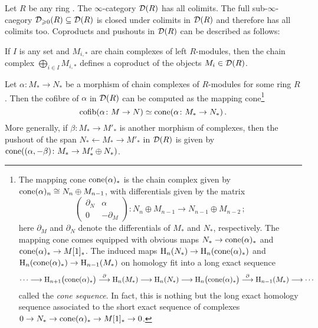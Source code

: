 \begin{lem}\label{lem:ColimitsInDR}
	Let $R$ be any ring . The $\infty$-category $\mathcal{D}(R)$ has all colimits. The full sub-$\infty$-caegory $\mathcal{D}_{\geqslant 0}(R)\subseteq \mathcal{D}(R)$ is closed under colimits in $\mathcal{D}(R)$ and therefore has all colimits too. Coproducts and pushouts in $\mathcal{D}(R)$ can be described as follows:
	\begin{alphanumerate}
		\item If $I$ is any set and $M_{i,*}$ are chain complexes of left $R$-modules, then the chain complex $\bigoplus_{i\in I}M_{i,*}$ defines a coproduct of the objects $M_i\in \mathcal{D}(R)$.\label{enum:CoproductsInDR}
		\item Let $\alpha\colon M_*\rightarrow N_*$ be a morphism of chain complexes of $R$-modules for some ring $R$. Then the cofibre of $\alpha$ in $\mathcal{D}(R)$ can be computed as the mapping cone\footnote{The mapping cone $\operatorname{cone}(\alpha)_*$ is the chain complex given by $\operatorname{cone}(\alpha)_n\cong N_n\oplus M_{n-1}$, with differentials given by the matrix
		\begin{equation*}
			\begin{pmatrix}
				\partial_N & \alpha\\
				0 & -\partial_M
			\end{pmatrix}\colon N_n\oplus M_{n-1}\rightarrow N_{n-1}\oplus M_{n-2}\,;
		\end{equation*}
		here $\partial_M$ and $\partial_N$ denote the differentials of $M_*$ and $N_*$, respectively. The mapping cone comes equipped with obvious maps $N_*\rightarrow \operatorname{cone}(\alpha)_*$ and $\operatorname{cone}(\alpha)_*\rightarrow M[1]_*$. The induced maps $\mathrm{H}_n(N_*)\rightarrow \mathrm{H}_n(\operatorname{cone}(\alpha)_*)$ and $\mathrm{H}_n(\operatorname{cone}(\alpha)_*)\rightarrow \mathrm{H}_{n-1}(M_*)$ on homology fit into a long exact sequence
		\begin{equation*}
			\dotsb\longrightarrow\mathrm{H}_{n+1}\bigl(\operatorname{cone}(\alpha)_*\bigr)\overset{\partial}{\longrightarrow} \mathrm{H}_n(M_*)\longrightarrow \mathrm{H}_n(N_*)\longrightarrow \mathrm{H}_n\bigl(\operatorname{cone}(\alpha)_*\bigr)\overset{\partial}{\longrightarrow}\mathrm{H}_{n-1}(M_*)\longrightarrow \dotsb
		\end{equation*}
		called the \emph{cone sequence}. In fact, this is nothing but the long exact homology sequence associated to the short exact sequence of complexes $0\rightarrow N_*\rightarrow \operatorname{cone}(\alpha)_*\rightarrow M[1]_*\rightarrow 0$.}\label{enum:CofibresInDR}
		\begin{equation*}
			\cofib\left(\alpha\colon M\rightarrow N\right)\simeq \cone\left(\alpha\colon M_*\rightarrow N_*\right)\,.
		\end{equation*}
		More generally, if $\beta\colon M_*\rightarrow M'_*$ is another morphism of complexes, then the pushout of the span $N_*\leftarrow M_*\rightarrow M'_*$ in $\mathcal{D}(R)$ is given by $\operatorname{cone}((\alpha,-\beta)\colon M_*\rightarrow M'_*\oplus N_*)$.
	\end{alphanumerate}
\end{lem}
